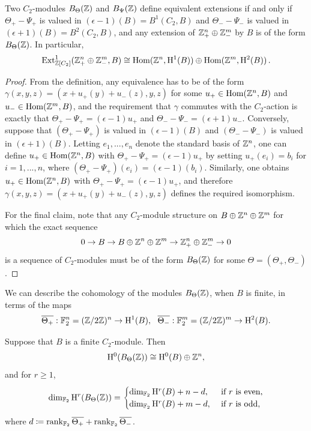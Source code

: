 \begin{cor} \label{even_part_ext_new}
Two $C_2$-modules $B_\Theta({\mathbb Z})$ and $B_{\Psi}({\mathbb Z})$ define equivalent extensions if and only if $\Theta_+-\Psi_+$ is valued in $(\epsilon - 1)(B) = B^1(C_2, B)$ and $\Theta_--\Psi_-$ is valued in $(\epsilon + 1)(B) = B^2(C_2, B)$, and any extension of $
{\mathbb Z}^n_+ \oplus {\mathbb Z}^m_-$ by $B$ is of the form $B_\Theta({\mathbb Z})$. In particular,
\[\operatorname{Ext}_{{\mathbb Z}[C_2]}^1 ({\mathbb Z}^n_+\oplus {\mathbb Z}^m_-, B) \cong \operatorname{Hom} ({\mathbb Z}^n,\mathrm{H}^1 (B)) \oplus \operatorname{Hom} ({\mathbb Z}^m,\mathrm{H}^2(B))\, .\] 
\end{cor}  

\begin{proof}
  From the definition, any equivalence has to be of the form $\gamma(x,y,z) = (x + u_+(y) + u_-(z), y,z)$ for some $u_+ \in \operatorname{Hom}({\mathbb Z}^n, B)$ and $u_- \in \operatorname{Hom}({\mathbb Z}^m, B)$, and the requirement that $\gamma$ commutes with the $C_2$-action is exactly that $\Theta_+-\Psi_+ = (\epsilon - 1)u_+$ and $\Theta_- -\Psi_- = (\epsilon + 1)u_-$. Conversely, suppose that $(\Theta_+-\Psi_+)$ is valued in $(\epsilon - 1)(B)$ and $(\Theta_--\Psi_-)$ is valued in $(\epsilon + 1)(B)$. Letting $e_1, ... , e_n$ denote the standard basis of ${\mathbb Z}^n$, one can define $u_+ \in \operatorname{Hom}({\mathbb Z}^n, B)$ with $\Theta_+-\Psi_+ = (\epsilon - 1)u_+$ by setting $u_+(e_i) = b_i$ for $i = 1,...,n$, where $(\Theta_+-\Psi_+)(e_i) = (\epsilon - 1)(b_i)$. Similarly, one obtains $u_+ \in \operatorname{Hom}({\mathbb Z}^n, B)$ with $\Theta_+-\Psi_+ = (\epsilon - 1)u_+$, and therefore $\gamma(x,y,z) = (x + u_+(y) + u_-(z), y,z)$ defines the required isomorphism.
  
  For the final claim, note that any $C_2$-module structure on $B \oplus {\mathbb Z}^n \oplus {\mathbb Z}^m$ for which the exact sequence
  \[
  0 \rightarrow B \rightarrow B \oplus {\mathbb Z}^n \oplus {\mathbb Z}^m \rightarrow {\mathbb Z}^n_+ \oplus {\mathbb Z}^m_- \rightarrow 0
  \]
  is a sequence of $C_2$-modules must be of the form $B_{\Theta}({\mathbb Z})$ for some $\Theta = (\Theta_+, \Theta_-)$.
\end{proof}

We can describe the cohomology of the modules $B_{\Theta}({\mathbb Z})$, when $B$ is finite, in terms of the maps
\begin{equation}\label{BTheta_reduced}
\overline{\Theta_+} : \bF_2^n = (\bZ/2\bZ)^n  \rightarrow \HH^1(B) , \ \  \overline{\Theta_- } : \bF_2^m = (\bZ/2\bZ)^m \rightarrow \HH^2 (B).
\end{equation}

\begin{prop}\label{prop:cohomofextensionexplicit} Suppose that $B$ is a finite $C_2$-module. Then
\[
\mathrm{H}^{0}(B_\Theta ({\mathbb Z})) \cong \mathrm{H}^0 (B) \oplus {\mathbb Z}^n,
\]
and for $r \geq 1$,
\[
 \dim_{{\mathbb F}_2} \mathrm{H}^r (B_\Theta ({\mathbb Z})) = 
\begin{cases}
\dim_{{\mathbb F}_2} \mathrm{H}^r(B) + n - d , & \mbox{ if $r$ is even}, \\
\dim_{{\mathbb F}_2} \mathrm{H}^r(B) + m - d, & \mbox{ if $r$ is odd},
\end{cases}
\]
where $d \coloneqq \rank_{{\mathbb F}_2} \overline{\Theta_+} + \rank_{{\mathbb F}_2} \overline{\Theta_-}$.
\end{prop}

